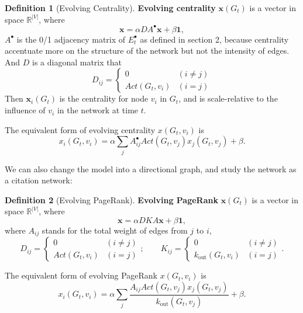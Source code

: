 \documentclass[12pt,abstract=true]{scrartcl}
\numberwithin{equation}{section}
\theoremstyle{definition}   \newtheorem{definition}{Definition}[section]
\theoremstyle{plain}        \newtheorem{theorem}{Theorem}[section]
\theoremstyle{plain}        \newtheorem{observation}{Observation}[section]
\theoremstyle{plain}        \newtheorem{fact}{Fact}[section]
\theoremstyle{plain}        \newtheorem{claim}{Claim}[section]
\theoremstyle{plain}        \newtheorem{lemma}[theorem]{Lemma}
\theoremstyle{plain}        \newtheorem{corollary}[theorem]{Corollary}
\theoremstyle{remark}       \newtheorem{example}{Example}[section]
\theoremstyle{remark}       \newtheorem{remark}{Remark}[section]
\begin{document}
\begin{definition}[Evolving Centrality]
\textbf{Evolving centrality} $\textbf{x}(G_t)$ is a vector in space
$\mathbb{R}^{|V|}$, where
\begin{equation}
\mathbf{x}=\alpha DA^\bullet \mathbf{x} + \beta\mathbf{1},
\end{equation}
$A^\bullet$ is the 0/1 adjacency matrix of $E^\bullet_t$ as defined in section 2,
because centrality accentuate more on the structure of the network but not the
intensity of edges. And
$D$ is a diagonal matrix that
\begin{equation}
D_{ij}=\begin{cases}
0&(i\neq j)\\
\mathit{Act}(G_t,v_i)&(i=j)
\end{cases}
\end{equation}
Then $\textbf{x}_i(G_t)$ is the centrality for node $v_i$ in $G_t$, and is
scale-relative to the influence of $v_i$ in the network at time $t$.
\end{definition}

The equivalent form of evolving centrality $x(G_t,v_i)$ is 
\begin{equation}
x_i(G_t,v_i)=\alpha\sum_jA^\bullet_{ij}
\mathit{Act}(G_t,v_j)x_j(G_t,v_j)+\beta.
\end{equation}

We can also change the model into a directional graph, and study the network as
a citation network:

\begin{definition}[Evolving PageRank]
\textbf{Evolving PageRank} $\textbf{x}(G_t)$ is a vector in space
$\mathbb{R}^{|V|}$, where
\begin{equation}
\mathbf{x}=\alpha DKA \mathbf{x} + \beta\mathbf{1},
\end{equation}
where $A_{ij}$ stands for the total weight of edges from $j$ to $i$,
\begin{equation}
D_{ij}=\begin{cases}
0&(i\neq j)\\
\mathit{Act}(G_t,v_i)&(i=j)
\end{cases};\qquad
K_{ij}=\begin{cases}
0&(i\neq j)\\
k_{\mathrm{out}}(G_t,v_i)&(i=j)
\end{cases}.
\end{equation}
\end{definition}

The equivalent form of evolving PageRank $x(G_t,v_i)$ is 
\begin{equation}
x_i(G_t,v_i)=\alpha\sum_j
\frac{A_{ij}\mathit{Act}(G_t,v_j)x_j(G_t,v_j)}{k_{\mathrm{out}}(G_t,v_j)}
+\beta.
\end{equation}
\end{document}
